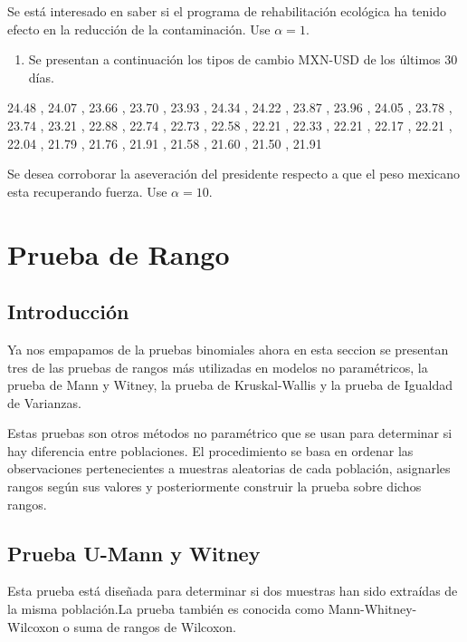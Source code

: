 \documentclass[
  a4paper,
  oneside,
  openany]{book}
\providecommand{\tightlist}{%
  \setlength{\itemsep}{0pt}\setlength{\parskip}{0pt}}
\begin{document}
Se está interesado en saber si el programa de rehabilitación ecológica ha tenido efecto en la reducción de la contaminación. Use \(\alpha =1%
\).

\begin{enumerate}
\def\labelenumi{\arabic{enumi}.}
\setcounter{enumi}{1}
\tightlist
\item
  Se presentan a continuación los tipos de cambio MXN-USD de los últimos 30 días.
\end{enumerate}

24.48 ,
24.07 ,
23.66 ,
23.70 ,
23.93 ,
24.34 ,
24.22 ,
23.87 ,
23.96 ,
24.05 ,
23.78 ,
23.74 ,
23.21 ,
22.88 ,
22.74 ,
22.73 ,
22.58 ,
22.21 ,
22.33 ,
22.21 ,
22.17 ,
22.21 ,
22.04 ,
21.79 ,
21.76 ,
21.91 ,
21.58 ,
21.60 ,
21.50 ,
21.91

Se desea corroborar la aseveración del presidente respecto a que el peso mexicano esta recuperando fuerza. Use \(\alpha =10%
\).

\hypertarget{part-prueba-de-rango}{%
\part{Prueba de Rango}\label{part-prueba-de-rango}}

\hypertarget{introducciuxf3n-2}{%
\chapter*{Introducción}\label{introducciuxf3n-2}}


Ya nos empapamos de la pruebas binomiales ahora en esta seccion se presentan tres de las pruebas de rangos más utilizadas en modelos no paramétricos, la prueba de Mann y Witney, la prueba de Kruskal-Wallis y la prueba de Igualdad de Varianzas.

Estas pruebas son otros métodos no paramétrico que se usan para determinar si hay diferencia entre poblaciones. El procedimiento se basa en ordenar las observaciones pertenecientes a muestras aleatorias de cada población, asignarles rangos según sus valores y posteriormente construir la prueba sobre dichos rangos.

\hypertarget{prueba-u-mann-y-witney}{%
\chapter{Prueba U-Mann y Witney}\label{prueba-u-mann-y-witney}}

Esta prueba está diseñada para determinar si dos muestras han sido extraídas de la misma población.La prueba también es conocida como Mann-Whitney-Wilcoxon o suma de rangos de Wilcoxon.
\end{document}
